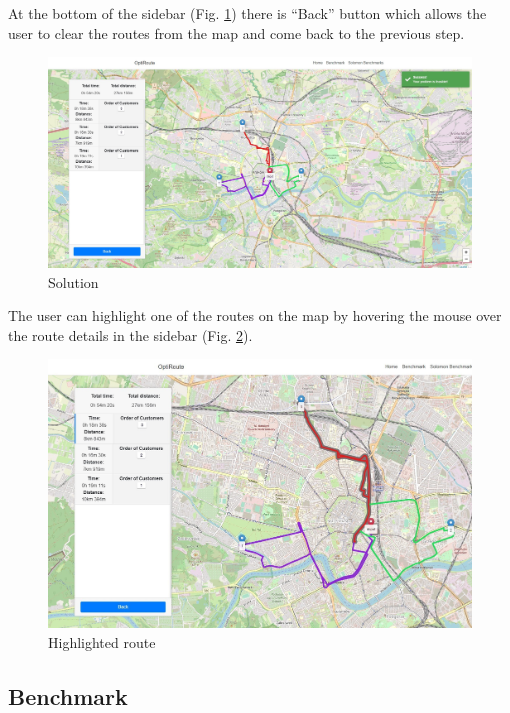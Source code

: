 \documentclass[a4paper,twoside,12pt]{book}
\begin{document}
At the bottom of the sidebar (Fig. \ref{fig:solution}) there is ``Back'' button which allows the user to clear the routes from the map and come back to the previous step.

\begin{figure}[htb]
\centering
\includegraphics[width=\textwidth]{images/solution.jpg}
\caption{Solution}
\label{fig:solution}
\end{figure}

The user can highlight one of the routes on the map by hovering the mouse over the route details in the sidebar (Fig. \ref{fig:solutionHover}).

\begin{figure}[htb]
\centering
\includegraphics[width=\textwidth]{images/solutionHover_updated.jpg}
\caption{Highlighted route}
\label{fig:solutionHover}
\end{figure}

\subsection{Benchmark}
\end{document}
